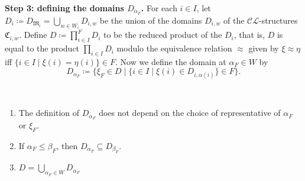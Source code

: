 \documentclass[submission,copyright,creativecommons]{eptcs}
\newcommand{\mo}{\mathfrak}
\newcommand{\CL}{\mathscr{C\!\!L}}   %
\begin{document}
  \smallskip\noindent
  \textbf{Step 3: defining the domains $D_{\alpha_F}$.}
    For each $i \in I$, let $D_i \coloneq D_{\mo{M}_i} = \bigcup_{w \in W_i} D_{i,w}$ be the union
    of the domains $D_{i,w}$ of the $\CL$-structures $\mo{C}_{i,w}$.
    Define $D \coloneq \prod_{i \in I}^F D_i$ to be the reduced
    product of the $D_i$, that is, $D$ is equal to the product $\prod_{i \in I} D_i$ modulo the
    equivalence relation $\approx$ given by $\xi \approx \eta$ iff $\{ i \in I \mid \xi(i) = \eta(i) \} \in F$. Now we define the domain at $\alpha_F \in W$ by
    \begin{equation*}
      D_{\alpha_F} \coloneq \{ \xi_F \in D \mid \{ i \in I \mid \xi(i) \in D_{i,\alpha(i)} \} \in F \}.
    \end{equation*}

    \begin{lemma}\label{lem:D} \
      \begin{enumerate}
        \item The definition of $D_{\alpha_F}$ does not depend on the 
              choice of representative of $\alpha_F$ or $\xi_F$.
        \item If $\alpha_F \leq \beta_F$, then $D_{\alpha_F} \subseteq D_{\beta_F}$.
        \item $D = \bigcup_{\alpha_F \in W} D_{\alpha_F}$
      \end{enumerate}
    \end{lemma}
\end{document}
